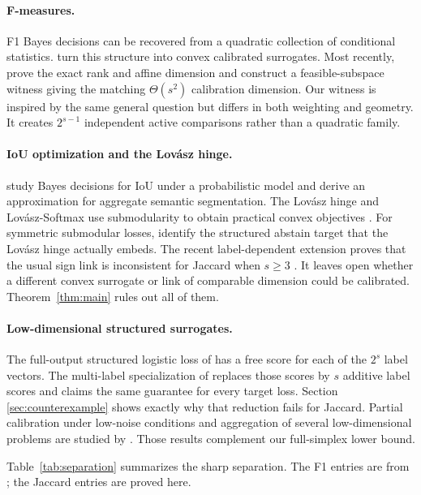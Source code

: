 \documentclass{article}
\newcommand{\1}{\mathbf 1}
\begin{document}
\paragraph{F-measures.}
F1 Bayes decisions can be recovered from a quadratic collection of conditional statistics. \citet{zhang2020fmeasure} turn this structure into convex calibrated surrogates. Most recently, \citet{zhang2026exact} prove the exact rank and affine dimension and construct a feasible-subspace witness giving the matching $\Theta(s^2)$ calibration dimension. Our witness is inspired by the same general question but differs in both weighting and geometry. It creates $2^{s-1}$ independent active comparisons rather than a quadratic family.

\paragraph{IoU optimization and the Lov\'asz hinge.}
\citet{nowozin2014iou} study Bayes decisions for IoU under a probabilistic model and derive an approximation for aggregate semantic segmentation. The Lov\'asz hinge and Lov\'asz-Softmax use submodularity to obtain practical convex objectives \citep{yu2018lovasz,berman2018lovasz}. For symmetric submodular losses, \citet{finocchiaro2022lovasz} identify the structured abstain target that the Lov\'asz hinge actually embeds. The recent label-dependent extension proves that the usual sign link is inconsistent for Jaccard when $s\geq3$ \citep{finocchiaro2025lovasz}. It leaves open whether a different convex surrogate or link of comparable dimension could be calibrated. Theorem~\ref{thm:main} rules out all of them.

\paragraph{Low-dimensional structured surrogates.}
The full-output structured logistic loss of \citet{mao2023structured} has a free score for each of the $2^s$ label vectors. The multi-label specialization of \citet{mao2024multilabel} replaces those scores by $s$ additive label scores and claims the same guarantee for every target loss. Section \ref{sec:counterexample} shows exactly why that reduction fails for Jaccard. Partial calibration under low-noise conditions and aggregation of several low-dimensional problems are studied by \citet{nueve2024tradeoff}. Those results complement our full-simplex lower bound.

Table~\ref{tab:separation} summarizes the sharp separation. The F1 entries are from \citet{zhang2026exact}; the Jaccard entries are proved here.
\end{document}
